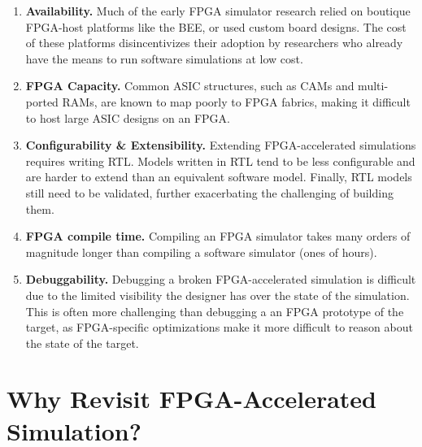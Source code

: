 \begin{enumerate}

    \item \textbf{Availability.} Much of the early FPGA simulator research
        relied on boutique FPGA-host platforms like the BEE\cite{bee2}, or
        used custom board designs. The cost of these platforms disincentivizes
        their adoption by researchers who already have the means to run
        software simulations at low cost.

    \item \textbf{FPGA Capacity.} Common ASIC structures, such as CAMs and
        multi-ported RAMs, are known to map poorly to FPGA
        fabrics\cite{fpgagap, fpgagap2}, making it difficult to host large ASIC
        designs on an FPGA.

    \item \textbf{Configurability \& Extensibility.} Extending FPGA-accelerated
        simulations requires writing RTL. Models written in RTL tend to be less
        configurable and are harder to extend than an equivalent software
        model. Finally, RTL models still need to be validated, further
        exacerbating the challenging of building them.

    \item \textbf{FPGA compile time.} Compiling an FPGA simulator takes many
        orders of magnitude longer than compiling a software simulator (ones of hours).

    \item \textbf{Debuggability.} Debugging a broken FPGA-accelerated
        simulation is difficult due to the limited visibility the designer has
        over the state of the simulation. This is often more challenging than
        debugging a an FPGA prototype of the target, as FPGA-specific
        optimizations make it more difficult to reason about the state of the
        target.

\end{enumerate}

\section{Why Revisit FPGA-Accelerated Simulation?}


